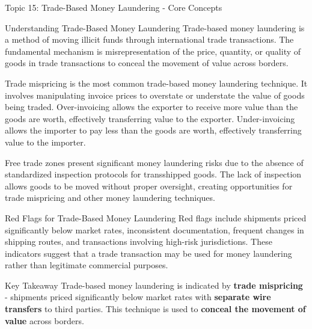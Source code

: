 \documentclass[5pt]{beamer}
\begin{document}
	\begin{frame}{Topic 15: Trade-Based Money Laundering - Core Concepts}
		\begin{block}{\tiny Understanding Trade-Based Money Laundering}
			\tiny Trade-based money laundering is a method of moving illicit funds through international trade transactions. The fundamental mechanism is misrepresentation of the price, quantity, or quality of goods in trade transactions to conceal the movement of value across borders.
			
			Trade mispricing is the most common trade-based money laundering technique. It involves manipulating invoice prices to overstate or understate the value of goods being traded. Over-invoicing allows the exporter to receive more value than the goods are worth, effectively transferring value to the exporter. Under-invoicing allows the importer to pay less than the goods are worth, effectively transferring value to the importer.
			
			Free trade zones present significant money laundering risks due to the absence of standardized inspection protocols for transshipped goods. The lack of inspection allows goods to be moved without proper oversight, creating opportunities for trade mispricing and other money laundering techniques.
		\end{block}
		
		\begin{block}{\tiny Red Flags for Trade-Based Money Laundering}
			\tiny Red flags include shipments priced significantly below market rates, inconsistent documentation, frequent changes in shipping routes, and transactions involving high-risk jurisdictions. These indicators suggest that a trade transaction may be used for money laundering rather than legitimate commercial purposes.
		\end{block}
		
		\begin{alertblock}{Key Takeaway}
			\tiny Trade-based money laundering is indicated by \textbf{trade mispricing} - shipments priced significantly below market rates with \textbf{separate wire transfers} to third parties. This technique is used to \textbf{conceal the movement of value} across borders.
		\end{alertblock}
	\end{frame}
	
\end{document}
